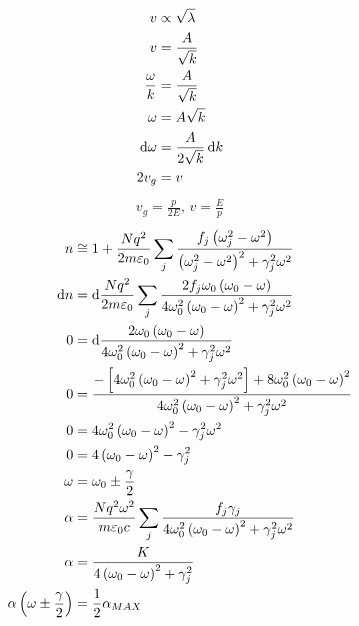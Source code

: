 \begin{align*}
    v&\propto\sqrt{\lambda}\\
    v&=\frac{A}{\sqrt{k}}\\
    \frac{\omega}{k}&=\frac{A}{\sqrt{k}}\\
    \omega&=A\sqrt{k}\\
    \dif\omega&=\frac{A}{2\sqrt{k}}\dif k\\
    2v_g&=v
\end{align*}
\begin{align*}
    v_g=\frac{p}{2E},\, v=\frac{E}{p}
\end{align*}
\begin{align*}
    n&\cong 1+\frac{Nq^2}{2m\varepsilon_0}\sum_j\frac{f_j\left(\omega_j^2-\omega^2\right)}{\left(\omega_j^2-\omega^2\right)^2+\gamma_j^2\omega^2}\\
    \dif n&=\dif \frac{Nq^2}{2m\varepsilon_0}\sum_j\frac{2f_j\omega_0\left(\omega_0-\omega\right)}{4\omega_0^2\left(\omega_0-\omega\right)^2+\gamma_j^2\omega^2}\\
    0&=\dif \frac{2\omega_0\left(\omega_0-\omega\right)}{4\omega_0^2\left(\omega_0-\omega\right)^2+\gamma_j^2\omega^2}\\
    0&=\frac{-\left[4\omega_0^2\left(\omega_0-\omega\right)^2+\gamma_j^2\omega^2\right]
    +8\omega_0^2\left(\omega_0-\omega\right)^2}{4\omega_0^2\left(\omega_0-\omega\right)^2+\gamma_j^2\omega^2}\\
    0&=
    4\omega_0^2\left(\omega_0-\omega\right)^2-\gamma_j^2\omega^2\\
    0&=
    4\left(\omega_0-\omega\right)^2-\gamma_j^2\\
    \omega&=\omega_0\pm\frac{\gamma}{2}\\
    \alpha&=\frac{Nq^2\omega^2}{m\varepsilon_0c}\sum_j\frac{f_j\gamma_j}{4\omega_0^2\left(\omega_0-\omega\right)^2+\gamma_j^2\omega^2}\\
    \alpha&=\frac{K}{4\left(\omega_0-\omega\right)^2+\gamma_j^2}\\
    \alpha\left(\omega\pm\frac{\gamma}{2}\right)&=\frac{1}{2}\alpha_{MAX}
\end{align*}

